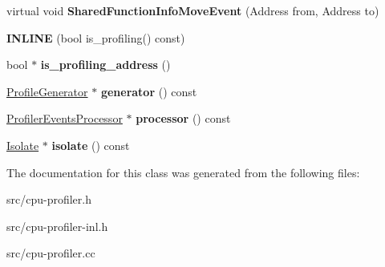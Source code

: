 \begin{DoxyCompactItemize}
\item 
\hypertarget{classv8_1_1internal_1_1_cpu_profiler_af0d7e731c7911fa3c241ed3590570ede}{}virtual void {\bfseries Shared\+Function\+Info\+Move\+Event} (Address from, Address to)\label{classv8_1_1internal_1_1_cpu_profiler_af0d7e731c7911fa3c241ed3590570ede}

\item 
\hypertarget{classv8_1_1internal_1_1_cpu_profiler_aa86e82e0bcbbb1b8cc386a539f543493}{}{\bfseries I\+N\+L\+I\+N\+E} (bool is\+\_\+profiling() const)\label{classv8_1_1internal_1_1_cpu_profiler_aa86e82e0bcbbb1b8cc386a539f543493}

\item 
\hypertarget{classv8_1_1internal_1_1_cpu_profiler_a272a447ab3258f3643aaee44a1990655}{}bool $\ast$ {\bfseries is\+\_\+profiling\+\_\+address} ()\label{classv8_1_1internal_1_1_cpu_profiler_a272a447ab3258f3643aaee44a1990655}

\item 
\hypertarget{classv8_1_1internal_1_1_cpu_profiler_a460b95c00fd76f316c9b2bc1b8fbe249}{}\hyperlink{classv8_1_1internal_1_1_profile_generator}{Profile\+Generator} $\ast$ {\bfseries generator} () const \label{classv8_1_1internal_1_1_cpu_profiler_a460b95c00fd76f316c9b2bc1b8fbe249}

\item 
\hypertarget{classv8_1_1internal_1_1_cpu_profiler_a9d411d096228db93e7e8c41023f279a4}{}\hyperlink{classv8_1_1internal_1_1_profiler_events_processor}{Profiler\+Events\+Processor} $\ast$ {\bfseries processor} () const \label{classv8_1_1internal_1_1_cpu_profiler_a9d411d096228db93e7e8c41023f279a4}

\item 
\hypertarget{classv8_1_1internal_1_1_cpu_profiler_a294dc8fbe0a2d94fe807160acc8dee3d}{}\hyperlink{classv8_1_1internal_1_1_isolate}{Isolate} $\ast$ {\bfseries isolate} () const \label{classv8_1_1internal_1_1_cpu_profiler_a294dc8fbe0a2d94fe807160acc8dee3d}

\end{DoxyCompactItemize}


The documentation for this class was generated from the following files\+:\begin{DoxyCompactItemize}
\item 
src/cpu-\/profiler.\+h\item 
src/cpu-\/profiler-\/inl.\+h\item 
src/cpu-\/profiler.\+cc\end{DoxyCompactItemize}
